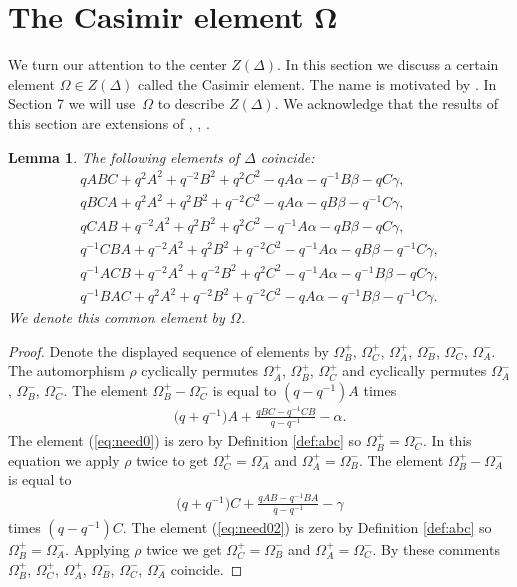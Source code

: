 \documentclass[pdftex]{sigma}
\numberwithin{equation}{section}
\newtheorem{Lemma}[Theorem]{Lemma}
\begin{document}
\section[The Casimir element $\Omega$]{The Casimir element $\boldsymbol{\Omega}$}

We turn our attention to the center $Z(\Delta)$.
In this section we discuss a certain
 element $\Omega \in Z(\Delta)$
 called the Casimir element.
The name is
motivated by
\cite[equation~(1.3)]{Zhidd}.
 In Section 7
we will use~$\Omega$ to describe
$Z(\Delta)$.
We acknowledge that the results of this section are
extensions of
\cite[Lemma~1]{posta2},
\cite[Section~6]{koro},
\cite[equation~(1.3)]{Zhidd}.

\begin{Lemma}
\label{lem:six}
The following elements of $\Delta $ coincide:
\begin{gather*}
qABC + q^2A^2+q^{-2}B^2+q^2C^2-q A\alpha -q^{-1} B\beta -q C\gamma,
\\
qBCA +
q^2A^2 +
q^2B^2+q^{-2}C^2
-q A\alpha
-qB\beta -q^{-1}C\gamma,
\\
qCAB +
q^{-2}A^2+q^2B^2
+q^2 C^2
-q^{-1} A\alpha -q B \beta
-q C\gamma,
\\
q^{-1}CBA + q^{-2}A^2+q^{2}B^2+q^{-2}C^2-q^{-1}A\alpha -q B\beta -
q^{-1} C\gamma,
\\
q^{-1}ACB +
q^{-2}A^2 +
q^{-2}B^2+q^{2}C^2
-q^{-1} A\alpha
-q^{-1}B\beta -q C\gamma,
\\
q^{-1}BAC +
q^{2}A^2+q^{-2}B^2
+q^{-2}C^2
-q A\alpha
-q^{-1} B \beta
-q^{-1} C\gamma.
\end{gather*}
We denote this common element by $\Omega$.
\end{Lemma}

\begin{proof}
Denote the displayed sequence of elements by
$\Omega^+_B$,
$\Omega^+_C$,
$\Omega^+_A$,
$\Omega^-_B$,
$\Omega^-_C$,
$\Omega^-_A$.
The automorphism
$\rho$ cyclically permutes
$\Omega^+_A$,
$\Omega^+_B$,
$\Omega^+_C$
and cyclically permutes
$\Omega^-_A$, $\Omega^-_B$, $\Omega^-_C$.
The element
$\Omega^+_B-\Omega^-_C$
is
equal to $(q-q^{-1})A$ times
\begin{gather}
\label{eq:need0}
\big(q+q^{-1}\big)A + \frac{qBC-q^{-1}CB}{q-q^{-1}} -\alpha.
\end{gather}
The element
(\ref{eq:need0}) is zero by Def\/inition
\ref{def:abc} so
$\Omega^+_B=\Omega^-_C$.
In this equation we apply $\rho$ twice to get
$\Omega^+_C=\Omega^-_A$
and
$\Omega^+_A=\Omega^-_B$.
The element
$\Omega^+_B-\Omega^-_A$ is equal to
\begin{gather}
\label{eq:need02}
\big(q+q^{-1}\big)C + \frac{qAB-q^{-1}BA}{q-q^{-1}} -\gamma
\end{gather}
times $(q-q^{-1})C$.
The element
(\ref{eq:need02}) is zero by Def\/inition
\ref{def:abc} so
$\Omega^+_B=\Omega^-_A$.
Applying $\rho$ twice we get
$\Omega^+_C=\Omega^-_B$
and
$\Omega^+_A=\Omega^-_C$.
By these comments
$\Omega^+_B$,
$\Omega^+_C$,
$\Omega^+_A$,
$\Omega^-_B$,
$\Omega^-_C$,
$\Omega^-_A$ coincide.
\end{proof}
\end{document}
